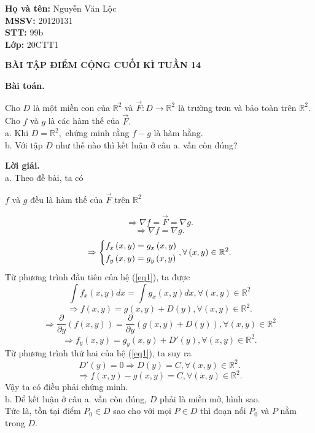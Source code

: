 \documentclass[12pt,a4paper]{article}
\author{Nguyễn Văn Lộc - 20120131}
\begin{document}
\begin{mybox}
\textbf{Họ và tên:} Nguyễn Văn Lộc\\
\textbf{MSSV:} 20120131\\
\textbf{STT:} 99b\\
\textbf{Lớp:} 20CTT1
\end{mybox}
\begin{center}
\textbf{BÀI TẬP ĐIỂM CỘNG CUỐI KÌ TUẦN 14}
\end{center}
\textbf{Bài toán.}
\begin{mybox}
Cho \(D\) là một miền con của \(\mathbb{R}^2\) và \(\vec F: D \to {\mathbb{R}^2}\) là trường trơn và bảo toàn trên \(\mathbb{R}^2.\) Cho \(f\) và \(g\) là các hàm thế của \(\vec F.\)\\
a. Khi \(D = \mathbb{R}^2,\) chứng minh rằng \(f - g\) là hàm hằng.\\
b. Với tập \(D\) như thế nào thì kết luận ở câu a. vẫn còn đúng?
\end{mybox}
\textbf{Lời giải.}\\
a. Theo đề bài, ta có
\begin{center}
\(f\) và \(g\) đều là hàm thế của \(\vec F\) trên \(\mathbb{R}^2\)
\end{center}
\[ \Rightarrow \nabla f = \vec F = \nabla g.\]
\[ \Rightarrow \nabla f = \nabla g.\]
\begin{equation}
 \Rightarrow \left\{ \begin{gathered}
  {f_x}\left( {x,y} \right) = {g_x}\left( {x,y} \right) \hfill \\
  {f_y}\left( {x,y} \right) = {g_y}\left( {x,y} \right) \hfill \\ 
\end{gathered}  \right., \forall \left( {x,y} \right) \in \mathbb{R}^2.
\label{eq1}
\end{equation}
Từ phương trình đầu tiên của hệ (\ref{eq1}), ta được
\[\int {{f_x}\left( {x,y} \right)dx}  = \int {{g_x}\left( {x,y} \right)dx}, \forall \left( {x,y} \right) \in \mathbb{R}^2 \]
\[ \Rightarrow f\left( {x,y} \right) = g\left( {x,y} \right) + D\left( y \right), \forall \left( {x,y} \right) \in \mathbb{R}^2.\]
\[ \Rightarrow \frac{\partial }{{\partial y}}\left( {f\left( {x,y} \right)} \right) = \frac{\partial }{{\partial y}}\left( {g\left( {x,y} \right) + D\left( y \right)} \right), \forall \left( {x,y} \right) \in \mathbb{R}^2\]
\[ \Rightarrow {f_y}\left( {x,y} \right) = {g_y}\left( {x,y} \right) + D'\left( y \right), \forall \left( {x,y} \right) \in \mathbb{R}^2.\]
Từ phương trình thứ hai của hệ (\ref{eq1}), ta suy ra 
\[D'\left( y \right) = 0 \Rightarrow D\left( y \right) = C, \forall \left( {x,y} \right) \in \mathbb{R}^2.\]
\[ \Rightarrow f\left( {x,y} \right) - g\left( {x,y} \right) = C, \forall \left( {x,y} \right) \in \mathbb{R}^2.\]
Vậy ta có điều phải chứng minh.\\
b. Để kết luận ở câu a. vẫn còn đúng, \(D\) phải là miền mở, hình sao.\\
Tức là, tồn tại điểm \(P_0 \in D\) sao cho với mọi \(P \in D\) thì đoạn nối \(P_0\) và \(P\) nằm trong \(D.\)
\end{document}
